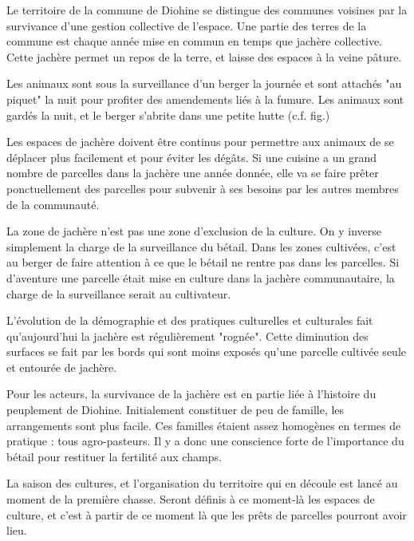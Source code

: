 Le territoire de la commune de Diohine se distingue des communes voisines par la survivance d'une gestion collective de l'espace. Une partie des terres de la commune est chaque année mise en commun en temps que jachère collective. Cette jachère permet un repos de la terre, et laisse des espaces à la veine pâture. 


Les animaux sont  sous la surveillance d'un berger la journée et sont attachés "au piquet" la nuit pour profiter des amendements liés à la fumure. Les animaux sont gardés la nuit, et le berger s'abrite dans une petite hutte (c.f. fig.)

Les espaces de jachère doivent être continus pour permettre aux animaux de se déplacer plus facilement et pour éviter les dégâts. Si une cuisine a un grand nombre de parcelles dans la jachère une année donnée, elle va se faire prêter ponctuellement des parcelles pour subvenir à ses besoins par les autres membres de la communauté. 

La zone de jachère n'est pas une zone d'exclusion de la culture. On y inverse simplement la charge de la surveillance du bétail. Dans les zones cultivées, c'est au berger de faire attention à ce que le bétail ne rentre pas dans les parcelles. Si d'aventure une parcelle était mise en culture dans la jachère communautaire, la charge de la surveillance serait au cultivateur. 

L'évolution de la démographie et des pratiques culturelles et culturales fait qu'aujourd'hui la jachère est régulièrement "rognée". Cette diminution des surfaces se fait par les bords qui sont moins exposés qu'une parcelle cultivée seule et entourée de jachère. 

Pour les acteurs, la survivance de la jachère est en partie liée à l'histoire du peuplement de Diohine. Initialement constituer de peu de famille, les arrangements sont plus facile. Ces familles étaient assez homogènes en termes de pratique : tous agro-pasteurs. Il y a donc une conscience forte de l'importance du bétail pour restituer la fertilité aux champs. 

La saison des cultures, et l'organisation du territoire qui en découle est lancé au moment de la première chasse. Seront définis à ce moment-là les espaces de culture, et c'est à partir de ce moment là que les prêts de parcelles pourront avoir lieu.

